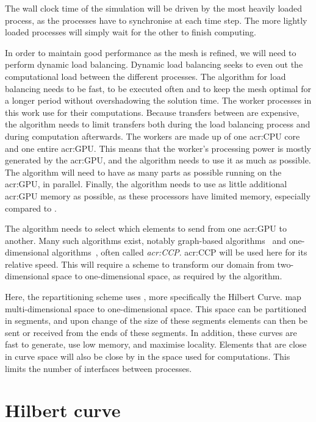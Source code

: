 The wall clock time of the simulation will be driven by the most heavily loaded process, as the
processes have to synchronise at each time step. The more lightly loaded processes will simply wait
for the other to finish computing.

In order to maintain good performance as the mesh is refined, we will need to perform dynamic load
balancing. Dynamic load balancing seeks to even out the computational load between the different
processes. The algorithm for load balancing needs to be fast, to be executed often and to keep the
mesh optimal for a longer period without overshadowing the solution time. The worker processes in
this work use  for their computations. Because transfers between
 are expensive, the algorithm needs to limit transfers both during the load
balancing process and during computation afterwards. The workers are made up of one
\acrshort{acr:CPU} core and one entire \acrshort{acr:GPU}. This means that the worker's processing
power is mostly generated by the \acrshort{acr:GPU}, and the algorithm needs to use it as much as
possible. The algorithm will need to have as many parts as possible running on the
\acrshort{acr:GPU}, in parallel. Finally, the algorithm needs to use as little additional
\acrshort{acr:GPU} memory as possible, as these processors have limited memory, especially compared
to .

The algorithm needs to select which elements to send from one \acrshort{acr:GPU} to another. Many
such algorithms exist, notably graph-based algorithms~\cite{Karypis1998} and one-dimensional
algorithms~\cite{Pinar2004}, often called \textit{\acrfull{acr:CCP}}. \Acrlong{acr:CCP} will be used
here for its relative speed. This will require a scheme to transform our domain from two-dimensional
space to one-dimensional space, as required by the algorithm.

Here, the repartitioning scheme uses \textit{}, more specifically the Hilbert
Curve.  map multi-dimensional space to one-dimensional space. This space can be
partitioned in segments, and upon change of the size of these segments elements can then be sent or
received from the ends of these segments. In addition, these curves are fast to generate, use low
memory, and maximise locality. Elements that are close in curve space will also be close by in the
space used for computations. This limits the number of interfaces between processes.

\section{Hilbert curve}\label{section:load_balancing:hilbert_curve}

